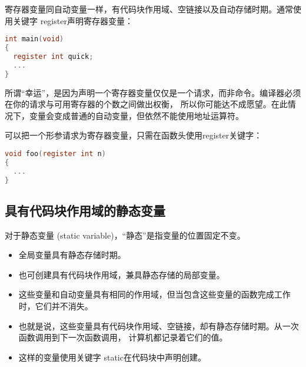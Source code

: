 \begin{frame}[fragile]\ft{\subsecname}

寄存器变量同自动变量一样，有代码块作用域、空链接以及自动存储时期。通常使用关键字{ register}声明寄存器变量：
\begin{lstlisting}[language=c,frame=single]
int main(void)
{
  register int quick;
  ...
}    
\end{lstlisting}
\end{frame}

\begin{frame}[fragile]\ft{\subsecname}
所谓“幸运”，是因为声明一个寄存器变量仅仅是一个请求，而非命令。编译器必须在你的请求与可用寄存器的个数之间做出权衡，
所以你可能达不成愿望。在此情况下，变量会变成普通的自动变量，但依然不能使用地址运算符。
\end{frame}

\begin{frame}[fragile]\ft{\subsecname}
可以把一个形参请求为寄存器变量，只需在函数头使用register关键字：
\begin{lstlisting}[language=c,frame=single]
void foo(register int n)
{
  ...
}    
\end{lstlisting}
\end{frame}

\subsection{具有代码块作用域的静态变量}
\begin{frame}[fragile]\ft{\subsecname}
对于静态变量{ (static variable)}，“静态”是指变量的位置固定不变。\vspace{0.05in}

\begin{itemize}
\item 全局变量具有静态存储时期。\\[0.15in]
\item 也可创建具有代码块作用域，兼具静态存储的局部变量。\\[0.1in]
\item[] 这些变量和自动变量具有相同的作用域，但当包含这些变量的函数完成工作时，它们并不消失。\\[0.1in]
\item[] 也就是说，这些变量具有代码块作用域、空链接，却有静态存储时期。从一次函数调用到下一次函数调用，
计算机都记录着它们的值。\\[0.1in]
\item[] 这样的变量使用关键字{ static}在代码块中声明创建。
\end{itemize}
\end{frame}

